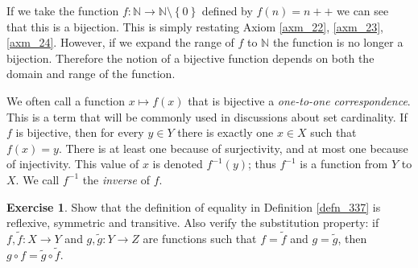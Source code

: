 \documentclass[a4paper, twocolumn]{report}
\newcounter{exercise} \numberwithin{exercise}{section}
\theoremstyle{definition}
\newtheorem{exc}[exercise]{Exercise}
\theoremstyle{solution}
\newcommand{\dplus}{{+}{+}} %
\begin{document}
If we take the function $f : \mathbb{N} \rightarrow \mathbb{N}\setminus\left\{
0 \right\}$ defined by $f(n) = n\dplus$ we can see that this is a bijection.
This is simply restating Axiom \ref{axm_22}, \ref{axm_23}, \ref{axm_24}.
However, if we expand the range of $f$ to $\mathbb{N}$ the function is no
longer a bijection.  Therefore the notion of a bijective function depends on
both the domain and range of the function.

We often call a function $x \mapsto f(x)$ that is bijective a
\textit{one-to-one correspondence}.  This is a term that will be commonly used
in discussions about set cardinality.  If $f$ is bijective, then for every $y
\in Y$ there is exactly one $x \in X$ such that $f(x) = y$. There is at least
one because of surjectivity, and at most one because of injectivity. This value
of $x$ is denoted $f^{-1}(y)$; thus $f^{-1}$ is a function from $Y$ to $X$. We
call $f^{-1}$ the \textit{inverse} of $f$.

\begin{exc}
  Show that the definition of equality in Definition \ref{defn_337} is
  reflexive, symmetric and transitive. Also verify the substitution property:
  if $f, \tilde{f}: X \rightarrow Y$ and $g, \tilde{g} : Y \rightarrow Z$ are
  functions such that $f = \tilde{f}$ and $g = \tilde{g}$, then $g \circ f =
  \tilde{g} \circ \tilde{f}$.
\end{exc}
\end{document}
